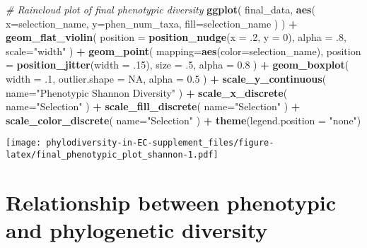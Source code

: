 \documentclass[]{book}
\newenvironment{Shaded}{\begin{snugshade}}{\end{snugshade}}
\newcommand{\CommentTok}[1]{\textcolor[rgb]{0.56,0.35,0.01}{\textit{#1}}}
\newcommand{\DataTypeTok}[1]{\textcolor[rgb]{0.13,0.29,0.53}{#1}}
\newcommand{\DecValTok}[1]{\textcolor[rgb]{0.00,0.00,0.81}{#1}}
\newcommand{\FloatTok}[1]{\textcolor[rgb]{0.00,0.00,0.81}{#1}}
\newcommand{\KeywordTok}[1]{\textcolor[rgb]{0.13,0.29,0.53}{\textbf{#1}}}
\newcommand{\NormalTok}[1]{#1}
\newcommand{\OperatorTok}[1]{\textcolor[rgb]{0.81,0.36,0.00}{\textbf{#1}}}
\newcommand{\OtherTok}[1]{\textcolor[rgb]{0.56,0.35,0.01}{#1}}
\newcommand{\StringTok}[1]{\textcolor[rgb]{0.31,0.60,0.02}{#1}}
\begin{document}
\begin{Shaded}
\begin{Highlighting}[]
\CommentTok{# Raincloud plot of final phenotypic diversity}
\KeywordTok{ggplot}\NormalTok{(}
\NormalTok{    final_data,}
    \KeywordTok{aes}\NormalTok{(}
      \DataTypeTok{x=}\NormalTok{selection_name,}
      \DataTypeTok{y=}\NormalTok{phen_num_taxa,}
      \DataTypeTok{fill=}\NormalTok{selection_name}
\NormalTok{    )}
\NormalTok{  ) }\OperatorTok{+}
\StringTok{  }\KeywordTok{geom_flat_violin}\NormalTok{(}
    \DataTypeTok{position =} \KeywordTok{position_nudge}\NormalTok{(}\DataTypeTok{x =} \FloatTok{.2}\NormalTok{, }\DataTypeTok{y =} \DecValTok{0}\NormalTok{),}
    \DataTypeTok{alpha =} \FloatTok{.8}\NormalTok{,}
    \DataTypeTok{scale=}\StringTok{"width"}
\NormalTok{  ) }\OperatorTok{+}
\StringTok{  }\KeywordTok{geom_point}\NormalTok{(}
    \DataTypeTok{mapping=}\KeywordTok{aes}\NormalTok{(}\DataTypeTok{color=}\NormalTok{selection_name),}
    \DataTypeTok{position =} \KeywordTok{position_jitter}\NormalTok{(}\DataTypeTok{width =} \FloatTok{.15}\NormalTok{),}
    \DataTypeTok{size =} \FloatTok{.5}\NormalTok{,}
    \DataTypeTok{alpha =} \FloatTok{0.8}
\NormalTok{  ) }\OperatorTok{+}
\StringTok{  }\KeywordTok{geom_boxplot}\NormalTok{(}
    \DataTypeTok{width =} \FloatTok{.1}\NormalTok{,}
    \DataTypeTok{outlier.shape =} \OtherTok{NA}\NormalTok{,}
    \DataTypeTok{alpha =} \FloatTok{0.5}
\NormalTok{  ) }\OperatorTok{+}
\StringTok{  }\KeywordTok{scale_y_continuous}\NormalTok{(}
    \DataTypeTok{name=}\StringTok{"Phenotypic Shannon Diversity"}
\NormalTok{  ) }\OperatorTok{+}
\StringTok{  }\KeywordTok{scale_x_discrete}\NormalTok{(}
    \DataTypeTok{name=}\StringTok{"Selection"}
\NormalTok{  ) }\OperatorTok{+}
\StringTok{  }\KeywordTok{scale_fill_discrete}\NormalTok{(}
    \DataTypeTok{name=}\StringTok{"Selection"}
\NormalTok{  ) }\OperatorTok{+}
\StringTok{  }\KeywordTok{scale_color_discrete}\NormalTok{(}
    \DataTypeTok{name=}\StringTok{"Selection"}
\NormalTok{  ) }\OperatorTok{+}
\StringTok{  }\KeywordTok{theme}\NormalTok{(}\DataTypeTok{legend.position =} \StringTok{"none"}\NormalTok{)}
\end{Highlighting}
\end{Shaded}

\texttt{[image: phylodiversity-in-EC-supplement\_files/figure-latex/final\_phenotypic\_plot\_shannon-1.pdf]}

\hypertarget{relationship-between-phenotypic-and-phylogenetic-diversity}{%
\section{Relationship between phenotypic and phylogenetic diversity}\label{relationship-between-phenotypic-and-phylogenetic-diversity}}
\end{document}
